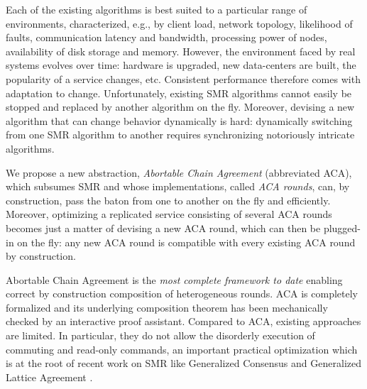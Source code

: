 Each of the existing algorithms is best suited to a particular range
of environments, characterized, e.g., by client load, network
topology, likelihood of faults, communication latency and bandwidth, processing
power of nodes, availability of disk storage and memory.
However, the environment faced by real systems evolves over time:
hardware is upgraded, new data-centers are built, the popularity of a
service changes, etc.  Consistent performance therefore comes with
adaptation to change.  Unfortunately, existing SMR algorithms cannot easily be
stopped and replaced by another algorithm on the fly. Moreover,
devising a new algorithm that can change behavior dynamically is hard:
dynamically switching from one SMR algorithm to another requires
synchronizing notoriously intricate algorithms.

We propose a new abstraction, \emph{Abortable Chain Agreement}
(abbreviated ACA), which subsumes SMR and whose implementations,
called \emph{ACA rounds}, can, by construction, pass the baton from
one to another on the fly and efficiently. Moreover, optimizing a replicated
service consisting of several ACA rounds becomes just a matter of devising a new
ACA round, which can then be plugged-in on the fly: any new ACA round
is compatible with every existing ACA round by construction.

Abortable Chain Agreement is the \emph{most complete framework to date} enabling
correct by construction composition of heterogeneous rounds.  
ACA is completely formalized and its underlying composition theorem has been
mechanically checked by an interactive proof assistant.  
Compared to ACA,
existing approaches
\cite{BarNoyETAL87ShiftingGearsChangingAlgorithmsFlyTo,GuerraouiETAL10Next700BftProtocols,GuerraouiKuncakLosa12SpeculativeLinearizability}
are limited. In particular, they do not allow the disorderly execution of
commuting and read-only commands, an important practical optimization
which is at the root of recent work on SMR like Generalized Consensus
\cite{Lamport05GeneralizeConsensus} and Generalized Lattice Agreement
\cite{FalerioETAL12GeneralizedLatticeAgreement}.

\begin{comment}
On top of the traditional roles of proposer, acceptor, and learners
\cite{lamport2001paxos} used in consensus algorithms, ACA introduces
the notion of \emph{switchers} and of \emph{scheduling policy}. The switchers
have the task of aborting a running ACA round and initializing a new
ACA round in a safe and live manner.  The \emph{scheduling policy}
decides when to abort an ACA round and choses the next ACA round to
execute. It must ensure that all switchers agree on the next ACA round
to initialize.
\end{comment}

